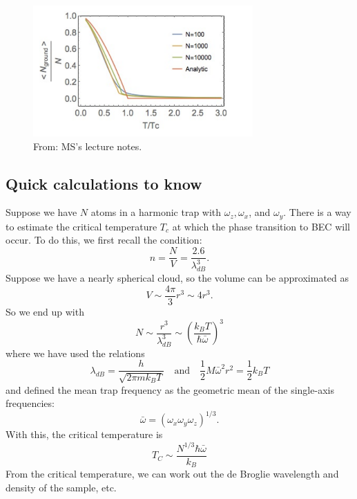 \documentclass{book}
\theoremstyle{definition}
\newcommand{\f}[2]{\frac{#1}{#2}}
\newcommand{\lp}{\left(}
\newcommand{\rp}{\right)}
\begin{document}
\begin{figure}[!htb]
	\centering
	\includegraphics[width=0.75\textwidth]{images/BEC_4}
	\caption{From: MS's lecture notes.}
	\label{fig:4}
\end{figure}




\subsection*{Quick calculations to know}

Suppose we have $N$ atoms in a harmonic trap with $\omega_z, \omega_x$, and $\omega_y$. There is a way to estimate the critical temperature $T_c$ at which the phase transition to BEC will occur. To do this, we first recall the condition:
\begin{equation*}
n = \f{N}{V} = \f{2.6}{\lambda_{dB}^3}.
\end{equation*}
Suppose we have a nearly spherical cloud, so the volume can be approximated as 
\begin{equation*}
V \sim \f{4\pi}{3}r^3 \sim 4r^3.
\end{equation*}
So we end up with
\begin{equation*}
N \sim \f{r^3}{\lambda_{dB}^3} \sim \lp \f{k_B T}{\hbar \bar{\omega}} \rp^{3}
\end{equation*}
where we have used the relations
\begin{equation*}
\lambda_{dB} = \f{h}{\sqrt{2\pi m k_B T}} \quad \text{and} \quad \f{1}{2}M \bar{\omega}^2 r^2 = \f{1}{2}k_B T
\end{equation*}
and defined the mean trap frequency as the geometric mean of the single-axis frequencies:
\begin{equation*}
\bar{\omega} = (\omega_x \omega_y \omega_z)^{1/3}.
\end{equation*}
With this, the critical temperature is 
\begin{equation*}
\boxed{T_C \sim \f{N^{1/3}\hbar \bar{\omega}}{k_B}}
\end{equation*}
From the critical temperature, we can work out the de Broglie wavelength and density of the sample, etc. 
 
\end{document}
